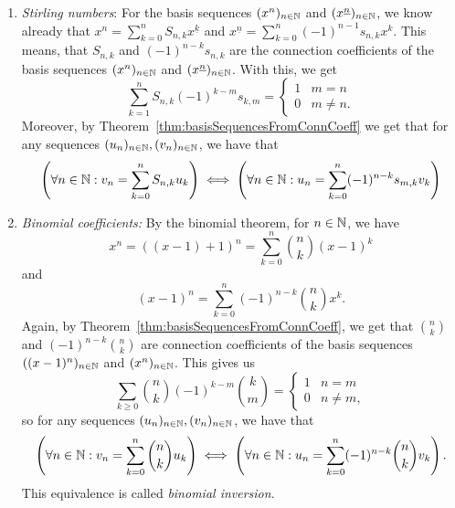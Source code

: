 \documentclass[language=english]{../../Template/TemplateLecture}
\begin{document}
\begin{beispiel}\leavevmode
    \begin{enumerate}[$(i)$]
        \item \emph{Stirling numbers}: For the basis sequences $(x^n)_{n \in \mathbb{N}}$ and $(x^{\underline{n}})_{n \in \mathbb{N}}$, we know already that $x^n = \sum_{k = 0}^n S_{n,k} x^{\underline{k}}$ and $x^{\underline{n}} = \sum_{k = 0}^n (-1)^{n-1} s_{n,k} x^k$. This means, that $S_{n,k}$ and $(-1)^{n-k} s_{n,k}$ are the connection coefficients of the basis sequences $(x^n)_{n \in \mathbb{N}}$ and $(x^{\underline{n}})_{n \in \mathbb{N}}$. With this, we get 
        \begin{equation}
            \sum_{k = 1}^n S_{n,k} (-1)^{k-m} s_{k,m} = \begin{cases}
                1 & m = n \\ 0 & m \neq n.
            \end{cases}
        \end{equation}
        Moreover, by Theorem~\ref{thm:basisSequencesFromConnCoeff} we get that for any sequences $(u_n)_{n \in \mathbb{N}}, (v_n)_{n \in \mathbb{N}}$, we have that
        \begin{equation}
            \left(\forall n \in \mathbb{N}: v_n = \sum_{k = 0}^n S_{n,k} u_k\right) \iff \left(\forall n \in \mathbb{N}: u_n = \sum_{k = 0}^n (-1)^{n-k} s_{m,k} v_k\right)
        \end{equation}
        \item \emph{Binomial coefficients:} By the binomial theorem, for $n \in \mathbb{N}$, we have
        \begin{equation}
            x^n = ((x-1) + 1)^n = \sum_{k = 0}^n \binom{n}{k} (x-1)^k
        \end{equation}
        and
        \begin{equation}
            (x-1)^n = \sum_{k = 0}^n (-1)^{n-k} \binom{n}{k} x^k.
        \end{equation}
        Again, by Theorem~\ref{thm:basisSequencesFromConnCoeff}, we get that $\binom{n}{k}$ and $(-1)^{n-k} \binom{n}{k}$ are connection coefficients of the basis sequences $((x-1)^n)_{n \in \mathbb{N}}$ and $(x^n)_{n \in \mathbb{N}}$. This gives us 
        \begin{equation}
            \sum_{k \geq 0} \binom{n}{k} (-1)^{k-m} \binom{k}{m} = \begin{cases}
                1 & n = m \\ 0 & n \neq m,
            \end{cases}
        \end{equation}
        so for any sequences $(u_n)_{n \in \mathbb{N}}, (v_n)_{n \in \mathbb{N}}$, we have that
        \begin{equation}
            \left(\forall n \in \mathbb{N}: v_n = \sum_{k = 0}^n \binom{n}{k} u_k\right) \iff \left(\forall n \in \mathbb{N}: u_n = \sum_{k = 0}^n (-1)^{n-k} \binom{n}{k} v_k\right).\label{eq:binomInversion1}
        \end{equation}
        This equivalence is called \emph{binomial inversion}.


\end{enumerate}
\end{beispiel}
\end{document}
